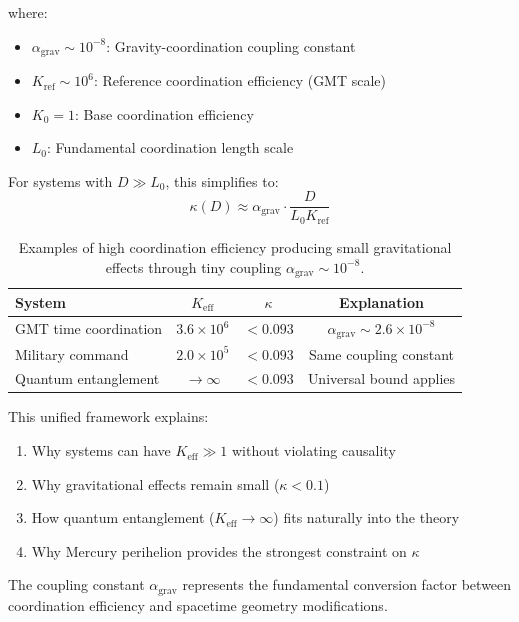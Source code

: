 \documentclass[11pt,a4paper]{article}
\begin{document}
	where:
	\begin{itemize}
		\item $\alpha_{\text{grav}} \sim 10^{-8}$: Gravity-coordination coupling constant
		\item $K_{\text{ref}} \sim 10^6$: Reference coordination efficiency (GMT scale)
		\item $K_0 = 1$: Base coordination efficiency
		\item $L_0$: Fundamental coordination length scale
	\end{itemize}
	
	For systems with $D \gg L_0$, this simplifies to:
	\begin{equation}
		\kappa(D) \approx \alpha_{\text{grav}} \cdot \frac{D}{L_0 K_{\text{ref}}}
	\end{equation}
	
	\begin{table}[htbp]
		\centering
		\begin{tabular}{lccc}
			\toprule
			\textbf{System} & \textbf{$K_{\mathrm{eff}}$} & \textbf{$\kappa$} & \textbf{Explanation} \\
			\midrule
			GMT time coordination & $3.6\times10^6$ & $<0.093$ & $\alpha_{\text{grav}} \sim 2.6\times10^{-8}$ \\
			Military command & $2.0\times10^5$ & $<0.093$ & Same coupling constant \\
			Quantum entanglement & $\to\infty$ & $<0.093$ & Universal bound applies \\
			\bottomrule
		\end{tabular}
		\caption{Examples of high coordination efficiency producing small gravitational effects through tiny coupling $\alpha_{\text{grav}} \sim 10^{-8}$.}
	\end{table}
	
	This unified framework explains:
	\begin{enumerate}
		\item Why systems can have $K_{\mathrm{eff}} \gg 1$ without violating causality
		\item Why gravitational effects remain small ($\kappa < 0.1$)
		\item How quantum entanglement ($K_{\mathrm{eff}} \to\infty$) fits naturally into the theory
		\item Why Mercury perihelion provides the strongest constraint on $\kappa$
	\end{enumerate}
	
	The coupling constant $\alpha_{\text{grav}}$ represents the fundamental conversion factor between coordination efficiency and spacetime geometry modifications.
	
\end{document}
